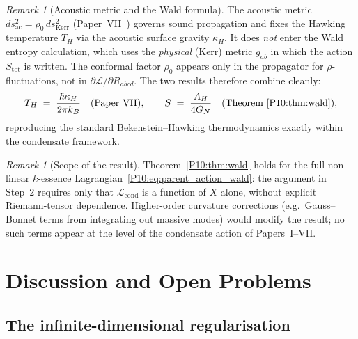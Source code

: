 \documentclass[11pt,a4paper]{article}
\theoremstyle{definition}
\theoremstyle{remark}
\newtheorem{remark}[theorem]{Remark}
\begin{document}
\begin{remark}[Acoustic metric and the Wald formula]
\label{P10:rem:acoustic_wald}
The acoustic metric $ds^2_\mathrm{ac} = \rho_0\,ds^2_\mathrm{Kerr}$
(Paper~VII~\cite{Paper7}) governs sound propagation and fixes the
Hawking temperature $T_H$ via the acoustic surface gravity $\kappa_H$.
It does \emph{not} enter the Wald entropy calculation, which uses
the \emph{physical} (Kerr) metric $g_{ab}$ in which the action
$S_\mathrm{tot}$ is written.
The conformal factor $\rho_0$ appears only in the propagator for
$\rho$-fluctuations, not in $\partial\mathcal{L}/\partial R_{abcd}$.
The two results therefore combine cleanly:
\begin{equation}
  T_H \;=\; \frac{\hbar\kappa_H}{2\pi k_B}
  \quad\text{(Paper~VII)},
  \qquad
  S \;=\; \frac{A_H}{4G_N}
  \quad\text{(Theorem~\ref{P10:thm:wald})},
  \label{P10:eq:TS_combined}
\end{equation}
reproducing the standard Bekenstein--Hawking thermodynamics exactly
within the condensate framework.
\end{remark}

\begin{remark}[Scope of the result]
\label{P10:rem:wald_scope}
Theorem~\ref{P10:thm:wald} holds for the full non-linear $k$-essence
Lagrangian~\eqref{P10:eq:parent_action_wald}: the argument in Step~2 requires only that
$\mathcal{L}_\mathrm{cond}$ is a function of $X$ alone, without
explicit Riemann-tensor dependence.
Higher-order curvature corrections (e.g.\ Gauss--Bonnet terms from
integrating out massive modes) would modify the result; no such terms
appear at the level of the condensate action of Papers~I--VII.
\end{remark}

\newpage
\section{Discussion and Open Problems}
\label{P10:sec:discussion}

\subsection{The infinite-dimensional regularisation}
\end{document}
